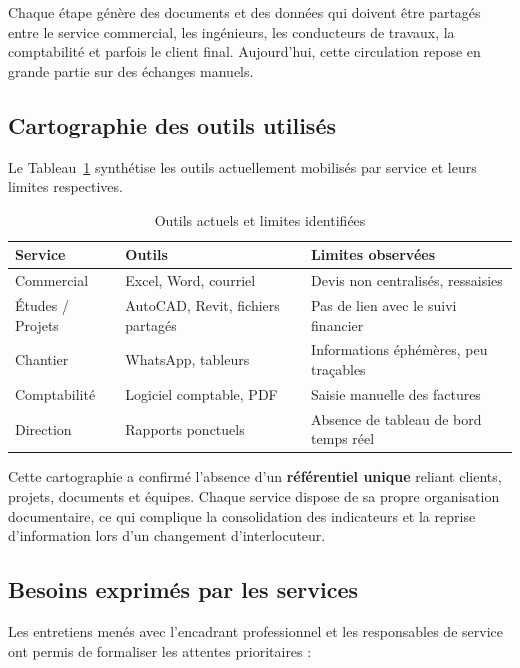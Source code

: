 Chaque étape génère des documents et des données qui doivent être partagés entre
le service commercial, les ingénieurs, les conducteurs de travaux, la comptabilité
et parfois le client final. Aujourd'hui, cette circulation repose en grande partie
sur des échanges manuels.

\subsection{Cartographie des outils utilisés}

Le Tableau~\ref{tab:outils_existants} synthétise les outils actuellement mobilisés
par service et leurs limites respectives.

\begin{table}[H]
\caption{Outils actuels et limites identifiées}
\label{tab:outils_existants}
\centering
\small
\begin{tabular}{|l|p{4.2cm}|p{5.8cm}|}
\hline
\textbf{Service} & \textbf{Outils} & \textbf{Limites observées} \\
\hline
Commercial & Excel, Word, courriel & Devis non centralisés, ressaisies \\
\hline
Études / Projets & AutoCAD, Revit, fichiers partagés & Pas de lien avec le suivi financier \\
\hline
Chantier & WhatsApp, tableurs & Informations éphémères, peu traçables \\
\hline
Comptabilité & Logiciel comptable, PDF & Saisie manuelle des factures \\
\hline
Direction & Rapports ponctuels & Absence de tableau de bord temps réel \\
\hline
\end{tabular}
\end{table}

Cette cartographie a confirmé l'absence d'un \textbf{référentiel unique} reliant
clients, projets, documents et équipes. Chaque service dispose de sa propre
organisation documentaire, ce qui complique la consolidation des indicateurs et
la reprise d'information lors d'un changement d'interlocuteur.

\subsection{Besoins exprimés par les services}

Les entretiens menés avec l'encadrant professionnel et les responsables de service
ont permis de formaliser les attentes prioritaires :

